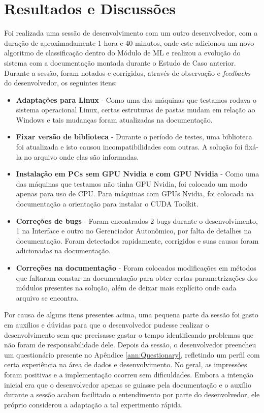 \documentclass[Portugues,Final]{ic-tese-v3}
\begin{document}
\section{Resultados e Discussões}

Foi realizada uma sessão de desenvolvimento com um outro desenvolvedor, com a duração de aproximadamente 1 hora e 40 minutos, onde este adicionou um novo algoritmo de classificação dentro do Módulo de ML e realizou a evolução do sistema com a documentação montada durante o Estudo de Caso anterior. Durante a sessão, foram notados e corrigidos, através de observação e \textit{feedbacks} do desenvolvedor, os seguintes itens:

\begin{itemize}
\item \textbf{Adaptações para Linux} - Como uma das máquinas que testamos rodava o sistema operacional Linux, certas estruturas de pastas mudam em relação ao Windows e tais mudanças foram atualizadas na documentação.
\item \textbf{Fixar versão de biblioteca} - Durante o período de testes, uma biblioteca foi atualizada e isto causou incompatibilidades com outras. A solução foi fixá-la no arquivo onde elas são informadas.
\item \textbf{Instalação em PCs sem GPU Nvidia e com GPU Nvidia} - Como uma das máquinas que testamos não tinha GPU Nvidia, foi colocado um modo apenas para uso de CPU. Para máquinas com GPUs Nvidia, foi colocada na documentação a orientação para instalar o CUDA Toolkit.
\item \textbf{Correções de bugs} - Foram encontrados 2 bugs durante o desenvolvimento, 1 na Interface e outro no Gerenciador Autonômico, por falta de detalhes na documentação. Foram detectados rapidamente, corrigidos e suas causas foram adicionadas na documentação.
\item \textbf{Correções na documentação} - Foram colocados modificações em métodos que faltaram constar na documentação para obter certas parametrizações dos módulos presentes na solução, além de deixar mais explícito onde cada arquivo se encontra.
\end{itemize}

Por causa de alguns itens presentes acima, uma pequena parte da sessão foi gasto em auxílios e dúvidas para que o desenvolvedor pudesse realizar o desenvolvimento sem que precisasse gastar o tempo identificando problemas que não foram de responsabilidade dele. Depois da sessão, o desenvolvedor preencheu um questionário presente no Apêndice \ref{ann:Questionary}, refletindo um perfil com certa experiência na área de dados e desenvolvimento. No geral, as impressões foram positivas e a implementação ocorreu sem dificuldades. Embora a intenção inicial era que o desenvolvedor apenas se guiasse pela documentação e o auxílio durante a sessão acabou facilitado o entendimento por parte do desenvolvedor, ele próprio considerou a adaptação a tal experimento rápida.
\end{document}
